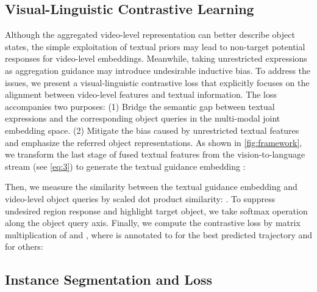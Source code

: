 \documentclass{article}
\begin{document}
\subsection{Visual-Linguistic Contrastive Learning}\label{sec:3.4}
Although the aggregated video-level representation can better describe object states, the simple exploitation of textual priors may lead to non-target  potential responses for video-level embeddings. Meanwhile, taking unrestricted expressions as aggregation guidance may introduce undesirable inductive bias. 
To address the issues, we present a visual-linguistic contrastive loss that explicitly focuses on the alignment between video-level features and textual information. 
The loss accompanies two purposes: (1) Bridge the semantic gap between textual expressions and the corresponding object queries in the multi-modal joint embedding space. (2) Mitigate the bias caused by unrestricted textual features and emphasize the referred object representations.
As shown in \cref{fig:framework}, we transform the last stage of fused textual features  from the vision-to-language stream (see \cref{eq:3}) to generate the textual guidance embedding :

Then, we measure the similarity between the textual guidance embedding and video-level object queries by scaled dot product similarity: .
To suppress undesired region response and highlight target object, we take softmax operation along the object query axis.
Finally, we compute the  contrastive loss  by matrix multiplication of  and , where  is annotated to  for the best predicted trajectory and  for others:



\subsection{Instance Segmentation and Loss}
\end{document}
